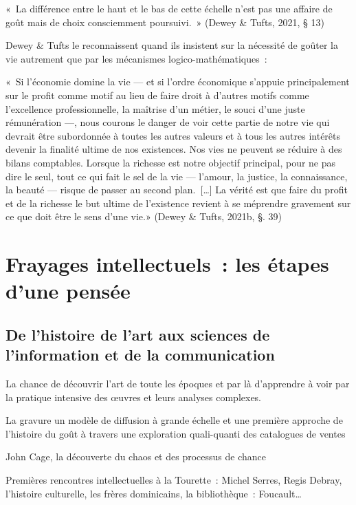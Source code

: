 \documentclass[
  a4paper,
  DIV=11,
  numbers=noendperiod]{scrreprt}
\begin{document}
«~La différence entre le haut et le bas de cette échelle n'est pas une
affaire de goût mais de choix consciemment poursuivi.~» (Dewey \& Tufts,
2021, § 13)

Dewey \& Tufts le reconnaissent quand ils insistent sur la nécessité de
goûter la vie autrement que par les mécanismes logico-mathématiques~:

«~Si l'économie domine la vie --- et si l'ordre économique s'appuie
principalement sur le profit comme motif au lieu de faire droit à
d'autres motifs comme l'excellence professionnelle, la maîtrise d'un
métier, le souci d'une juste rémunération ---, nous courons le danger de
voir cette partie de notre vie qui devrait être subordonnée à toutes les
autres valeurs et à tous les autres intérêts devenir la finalité ultime
de nos existences. Nos vies ne peuvent se réduire à des bilans
comptables. Lorsque la richesse est notre objectif principal, pour ne
pas dire le seul, tout ce qui fait le sel de la vie --- l'amour, la
justice, la connaissance, la beauté --- risque de passer au second
plan.~{[}\ldots{]} La vérité est que faire du profit et de la richesse
le but ultime de l'existence revient à se méprendre gravement sur ce que
doit être le sens d'une vie.» (Dewey \& Tufts, 2021b, §. 39)

\chapter{Frayages intellectuels~: les étapes d'une
pensée}\label{sec-frayages}

\section{De l'histoire de l'art aux sciences de l'information et de la
communication}\label{de-lhistoire-de-lart-aux-sciences-de-linformation-et-de-la-communication}

La chance de découvrir l'art de toute les époques et par là d'apprendre
à voir par la pratique intensive des œuvres et leurs analyses complexes.

La gravure un modèle de diffusion à grande échelle et une première
approche de l'histoire du goût à travers une exploration quali-quanti
des catalogues de ventes

John Cage, la découverte du chaos et des processus de chance

Premières rencontres intellectuelles à la Tourette~: Michel Serres,
Regis Debray, l'histoire culturelle, les frères dominicains, la
bibliothèque~: Foucault\ldots{}
\end{document}
